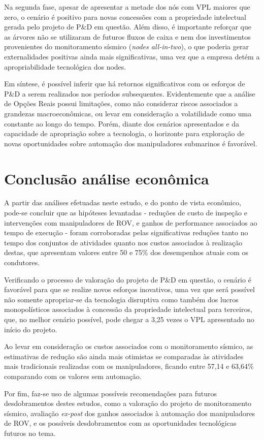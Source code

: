 Na segunda fase, apesar de apresentar a metade dos nós com VPL maiores que zero, o cenário é positivo para novas concessões com a propriedade intelectual gerada pelo projeto de P\&D em questão. Além disso, é importante reforçar que as árvores não se utilizaram de futuros fluxos de caixa e nem dos investimentos provenientes do monitoramento sísmico (\textit{nodes all-in-two}), o que poderia gerar externalidades positivas ainda mais significativas, uma vez que a empresa detém a apropriabilidade tecnológica dos nodes. 

Em síntese, é possível inferir que há retornos significativos com os esforços de P\&D a serem realizados nos períodos subsequentes. Evidentemente que a análise de Opções Reais possui limitações, como não considerar riscos associados a grandezas macroeconômicas, ou levar em consideração a volatilidade como uma constante ao longo do tempo. Porém, diante dos cenários apresentados e da capacidade de apropriação sobre a tecnologia, o horizonte para exploração de novas oportunidades sobre automação dos manipuladores submarinos é favorável.


\section{Conclusão análise econômica}
\label{sec:rskdesen}

A partir das análises efetuadas neste estudo, e do ponto de vista econômico, pode-se concluir que as hipóteses levantadas - reduções de custo de inspeção e intervenções com manipuladores de ROV, e ganhos de performance associados ao tempo de execução - foram corroboradas pelas significativas reduções tanto no tempo dos conjuntos de atividades quanto nos custos associados à realização destas, que apresentam valores entre 50 e 75\% dos desempenhos atuais com os condutores. 

Verificando o processo de valoração do projeto de P\&D em questão, o cenário é favorável para que se realize novos esforços inovativos, uma vez que será possível não somente apropriar-se da tecnologia disruptiva como também dos lucros monopolísticos associados à concessão da propriedade intelectual para terceiros, que, no melhor cenário possível, pode chegar a 3,25 vezes o VPL apresentado no início do projeto. 

Ao levar em consideração os custos associados com o monitoramento sísmico, as estimativas de redução são ainda mais otimistas se comparadas às atividades mais tradicionais realizadas com os manipuladores, ficando entre 57,14 e 63,64\% comparando com os valores sem automação. 

Por fim, faz-se uso de algumas possíveis recomendações para futuros desdobramentos destes estudos, como a valoração do projeto de monitoramento sísmico, avaliação \textit{ex-post} dos ganhos associados à automação dos manipuladores de ROV, e os possíveis desdobramentos com as oportunidades tecnológicas futuros no tema. 

